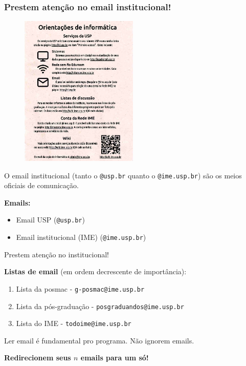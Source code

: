 \documentclass{beamer}
\begin{document}
\begin{frame}[fragile]
  \frametitle{Prestem atenção no email institucional!}

  \begin{figure}
    \centering\includegraphics[width=0.5\textwidth]{imgs/email.png}
  \end{figure}

  O email institucional (tanto o \texttt{@usp.br} quanto o \texttt{@ime.usp.br}) são os meios
  oficiais de comunicação.
\end{frame}

\begin{frame}
  \textbf{Emails:}
  \begin{itemize}
    \item Email USP (\texttt{@usp.br})
    \item Email institucional (IME) (\texttt{@ime.usp.br})
  \end{itemize}
  Prestem atenção no institucional!
  \vskip 0.5cm

  \textbf{Listas de email} (em ordem decrescente de importância):
  \begin{enumerate}
    \item Lista da posmac - \texttt{g-posmac@ime.usp.br}
    \item Lista da pós-graduação - \texttt{posgraduandos@ime.usp.br}
    \item Lista do IME - \texttt{todoime@ime.usp.br}
  \end{enumerate}
  \vskip 0.5cm

  Ler email é fundamental pro programa. Não ignorem emails.
  \vskip 0.5cm

  \textbf{Redirecionem seus $n$ emails para um só!}
\end{frame}
\end{document}
